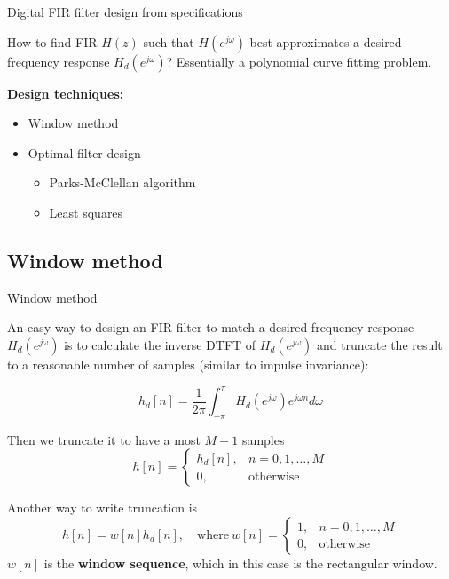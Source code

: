 \documentclass[10pt, handout]{beamer}
\begin{document}
%
\begin{frame}{Digital FIR filter design from specifications}
	
	How to find FIR $H(z)$ such that $H(e^{j\omega})$ best approximates a desired frequency response $H_d(e^{j\omega})$? Essentially a polynomial curve fitting problem.
	\begin{center}
		\resizebox{0.6\linewidth}{!}{}
	\end{center}
	
	\textbf{Design techniques:}
	\begin{itemize}
		\item Window method
		\item Optimal filter design
		\begin{itemize}
			\item Parks-McClellan algorithm
			\item Least squares
		\end{itemize}
	\end{itemize}
\end{frame}


\subsection{Window method}
%
\begin{frame}{Window method}

An easy way to design an FIR filter to match a desired frequency response $H_d(e^{j\omega})$ is to calculate the inverse DTFT of $H_d(e^{j\omega})$ and truncate the result to a reasonable number of samples (similar to impulse invariance):

\begin{equation}
	h_d[n] = \frac{1}{2\pi}\int_{-\pi}^{\pi}H_d(e^{j\omega})e^{j\omega n} d\omega \tag{inverse DTFT}
\end{equation}

Then we truncate it to have a most $M+1$ samples
\begin{equation}
	h[n] = \begin{cases}
	h_d[n], & n = 0, 1, \ldots, M \\
	0, & \text{otherwise}
	\end{cases} \tag{truncated sequence}
\end{equation} 

Another way to write truncation is 
\begin{equation*}
	h[n] = w[n]h_d[n], \quad\text{where}~w[n] = \begin{cases}
	1, & n = 0, 1, \ldots, M \\
	0, & \text{otherwise}
	\end{cases} \tag{truncated sequence}
\end{equation*}
$w[n]$ is the \textbf{window sequence}, which in this case is the rectangular window. 
\end{frame}
\end{document}
